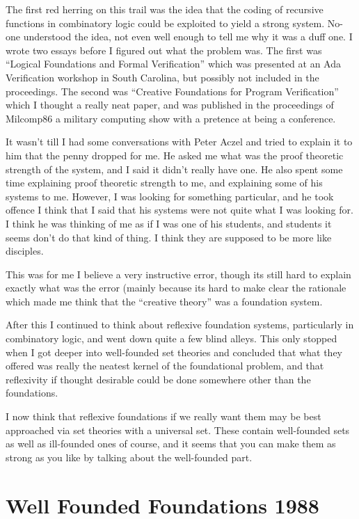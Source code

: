The first red herring on this trail was the idea that the coding of recursive functions in combinatory logic could be exploited to yield a strong system.
No-one understood the idea, not even well enough to tell me why it was a duff one.
I wrote two essays before I figured out what the problem was.
The first was ``Logical Foundations and Formal Verification'' which was presented at an Ada Verification workshop in South Carolina, but possibly not included in the proceedings.
The second was ``Creative Foundations for Program Verification'' which I thought a really neat paper, and was published in the proceedings of Milcomp86 a military computing show with a pretence at being a conference.

It wasn't till I had some conversations with Peter Aczel and tried to explain it to him that the penny dropped for me.
He asked me what was the proof theoretic strength of the system, and I said it didn't really have one.
He also spent some time explaining proof theoretic strength to me, and explaining some of his systems to me.
However, I was looking for something particular, and he took offence I think that I said that his systems were not quite what I was looking for.
I think he was thinking of me as if I was one of his students, and students it seems don't do that kind of thing.
I think they are supposed to be more like disciples.

This was for me I believe a very instructive error, though its still hard to explain exactly what was the error (mainly because its hard to make clear the rationale which made me think that the ``creative theory'' was a foundation system.

After this I continued to think about reflexive foundation systems, particularly in combinatory logic, and went down quite a few blind alleys.
This only stopped when I got deeper into well-founded set theories and concluded that what they offered was really the neatest kernel of the foundational problem, and that reflexivity if thought desirable could be done somewhere other than the foundations.

I now think that reflexive foundations if we really want them may be best approached via set theories with a universal set.
These contain well-founded sets as well as ill-founded ones of course, and it seems that you can make them as strong as you like by talking about the well-founded part.

\section{Well Founded Foundations 1988}

